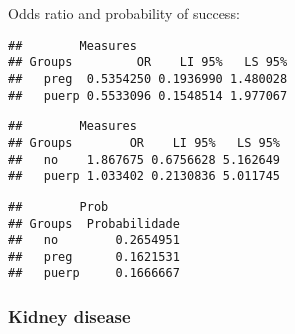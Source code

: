 \documentclass[
]{article}
\newenvironment{Shaded}{\begin{snugshade}}{\end{snugshade}}
\newcommand{\CommentTok}[1]{\textcolor[rgb]{0.56,0.35,0.01}{\textit{#1}}}
\newcommand{\KeywordTok}[1]{\textcolor[rgb]{0.13,0.29,0.53}{\textbf{#1}}}
\newcommand{\NormalTok}[1]{#1}
\newcommand{\OperatorTok}[1]{\textcolor[rgb]{0.81,0.36,0.00}{\textbf{#1}}}
\newcommand{\StringTok}[1]{\textcolor[rgb]{0.31,0.60,0.02}{#1}}
\begin{document}
Odds ratio and probability of success:

\begin{Shaded}
\end{Shaded}

\begin{verbatim}
##        Measures
## Groups         OR    LI 95%   LS 95%
##   preg  0.5354250 0.1936990 1.480028
##   puerp 0.5533096 0.1548514 1.977067
\end{verbatim}

\begin{Shaded}
\end{Shaded}

\begin{verbatim}
##        Measures
## Groups        OR    LI 95%   LS 95%
##   no    1.867675 0.6756628 5.162649
##   puerp 1.033402 0.2130836 5.011745
\end{verbatim}

\begin{Shaded}
\end{Shaded}

\begin{verbatim}
##        Prob
## Groups  Probabilidade
##   no        0.2654951
##   preg      0.1621531
##   puerp     0.1666667
\end{verbatim}

\hypertarget{kidney-disease-1}{%
\subsubsection{Kidney disease}\label{kidney-disease-1}}

\begin{Shaded}
\end{Shaded}
\end{document}
